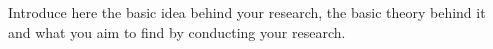 \documentclass[main.tex]{subfiles}
\begin{document}
	Introduce here the basic idea behind your research, the basic theory behind it
	and what you aim to find by conducting your research.
\end{document}
